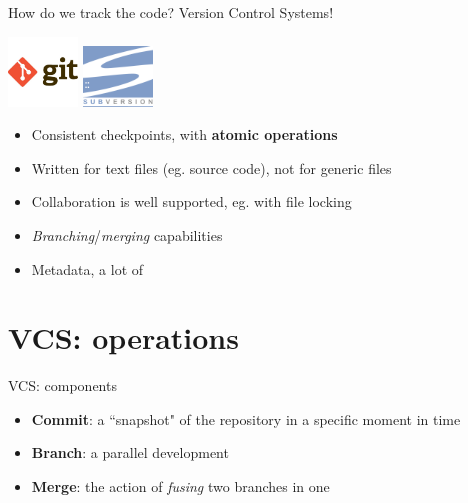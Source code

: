 \begin{frame}[fragile]{How do we track the code? Version Control Systems!}

\begin{center}
\includegraphics[width=5em]{git-logo}
\hspace{10em}
\includegraphics[width=5em]{subversion-logo}
\end{center}

\begin{itemize}
  \item Consistent checkpoints, with \textbf{atomic operations}
  \item Written for text files (eg. source code), not for generic files
  \item Collaboration is well supported, eg. with file locking
  \item \textit{Branching}/\textit{merging} capabilities
  \item Metadata, a lot of
\end{itemize}

\end{frame}


\section{VCS: operations}

\begin{frame}[fragile]{VCS: components}

\begin{itemize}
  \item \textbf{Commit}: a ``snapshot" of the repository in a specific moment in time
  \item \textbf{Branch}: a parallel development
  \item \textbf{Merge}: the action of \textit{fusing} two branches in one
\end{itemize}

\end{frame}


